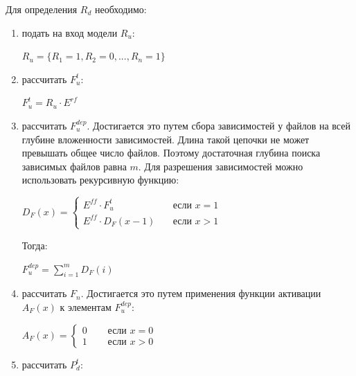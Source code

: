 \documentclass{article}
\begin{document}
  Для определения $R_{d}$ необходимо:
  \begin{enumerate}
    \item подать на вход модели $R_{u}$:

    \begin{center}
      $R_{u} = \{R_{1} = 1, R_{2} = 0, ..., R_{n} = 1\}$
    \end{center}

    \item рассчитать $F^{t}_{u}$:

    \begin{center}
      $F^{t}_{u} = R_{u} \cdot E^{rf}$
    \end{center}

    \item рассчитать $F^{dep}_{u}$. Достигается это путем сбора зависимостей у файлов на всей глубине вложенности зависимостей. Длина такой цепочки не может превышать общее число файлов. Поэтому достаточная глубина поиска зависимых файлов равна $m$. Для разрешения зависимостей можно использовать рекурсивную функцию:
    
    \begin{center}
    $
    D_{F}(x) = 
      \begin{cases}
        E^{ff} \cdot F^{t}_{u} & \quad \text{если } x = 1 \\
        E^{ff} \cdot D_{F}(x - 1) & \quad \text{если } x > 1
      \end{cases}
    $
    \end{center}

    Тогда:

    \begin{center}
      $F^{dep}_{u} = \displaystyle\sum^m_{i = 1}D_{F}(i)$
    \end{center}

    \item рассчитать $F_n$. Достигается это путем применения функции активации $A_{F}(x)$ к элементам $F^{dep}_{u}$:

    \begin{center}
      $
      A_{F}(x) = 
        \begin{cases}
          0 & \quad \text{ если } x = 0 \\
          1 & \quad \text{ если } x > 0
        \end{cases}
      $
    \end{center}

    \item рассчитать $P^{t}_{d}$:


\end{enumerate}
\end{document}
